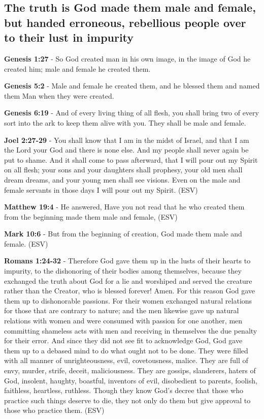 \documentclass[11pt]{article}
\begin{document}
\subsection{The truth is God made them male and female, but handed erroneous, rebellious people over to their lust in impurity}
\label{sec:org0f5b22b}
\textbf{Genesis 1:27} - So God created man in his own image, in the image of God he created him; male and female he created them.

\textbf{Genesis 5:2} - Male and female he created them, and he blessed them and named them Man when they were created.

\textbf{Genesis 6:19} - And of every living thing of all flesh, you shall bring two of every sort into the ark to keep them alive with you. They shall be male and female.

\textbf{Joel 2:27-29} - You shall know that I am in the midst of Israel, and that I am the Lord your God and there is none else. And my people shall never again be put to shame.  And it shall come to pass afterward, that I will pour out my Spirit on all flesh; your sons and your daughters shall prophesy, your old men shall dream dreams, and your young men shall see visions.  Even on the male and female servants in those days I will pour out my Spirit. (ESV)

\textbf{Matthew 19:4} - He answered, Have you not read that he who created them from the beginning made them male and female, (ESV)

\textbf{Mark 10:6} - But from the beginning of creation, God made them male and female. (ESV)

\textbf{Romans 1:24-32} - Therefore God gave them up in the lusts of their hearts to impurity, to the dishonoring of their bodies among themselves, because they exchanged the truth about God for a lie and worshiped and served the creature rather than the Creator, who is blessed forever! Amen.  For this reason God gave them up to dishonorable passions.  For their women exchanged natural relations for those that are contrary to nature; and the men likewise gave up natural relations with women and were consumed with passion for one another, men committing shameless acts with men and receiving in themselves the due penalty for their error.  And since they did not see fit to acknowledge God, God gave them up to a debased mind to do what ought not to be done.  They were filled with all manner of unrighteousness, evil, covetousness, malice.  They are full of envy, murder, strife, deceit, maliciousness.  They are gossips, slanderers, haters of God, insolent, haughty, boastful, inventors of evil, disobedient to parents, foolish, faithless, heartless, ruthless.  Though they know God's decree that those who practice such things deserve to die, they not only do them but give approval to those who practice them.  (ESV)
\end{document}
